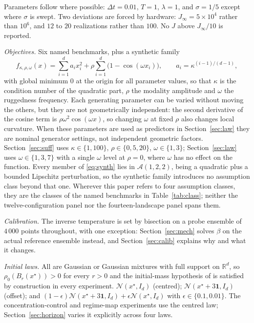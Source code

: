 \documentclass[pdflatex,sn-mathphys-num]{sn-jnl}
\theoremstyle{thmstyleone}
\theoremstyle{thmstyletwo}
\theoremstyle{thmstylethree}
\begin{document}
Parameters follow \cite[Table 1]{ghv2025} where possible: $\Delta t=0.01$, $T=1$, $\lambda=1$, and $\sigma=1/5$ except where $\sigma$ is swept. Two deviations are forced by hardware: $J_\infty=5\times10^4$ rather than $10^6$, and $12$ to $20$ realizations rather than $100$. No $J$ above $J_\infty/10$ is reported.

\emph{Objectives.} Six named benchmarks, plus a synthetic family
\begin{equation}\label{eq:synth}
f_{\kappa,\rho,\omega}(x)=\sum_{i=1}^d a_i x_i^2+\rho\sum_{i=1}^d\bigl(1-\cos(\omega x_i)\bigr),
\qquad a_i=\kappa^{(i-1)/(d-1)},
\end{equation}
with global minimum $0$ at the origin for all parameter values, so that $\kappa$ is the condition number of the quadratic part, $\rho$ the modality amplitude and $\omega$ the ruggedness frequency. Each generating parameter can be varied without moving the others, but they are not geometrically independent: the second derivative of the cosine term is $\rho\omega^2\cos(\omega x)$, so changing $\omega$ at fixed $\rho$ also changes local curvature. When these parameters are used as predictors in Section~\ref{sec:law} they are nominal generator settings, not independent geometric factors. Section~\ref{sec:suff} uses $\kappa\in\{1,100\}$, $\rho\in\{0,5,20\}$, $\omega\in\{1,3\}$; Section~\ref{sec:law} uses $\omega\in\{1,3,7\}$ with a single $\omega$ level at $\rho=0$, where $\omega$ has no effect on the function. Every member of \eqref{eq:synth} lies in $\mathcal A(1,2,2)$, being a quadratic plus a bounded Lipschitz perturbation, so the synthetic family introduces no assumption class beyond that one. Wherever this paper refers to four assumption classes, they are the classes of the named benchmarks in Table~\ref{tab:class}; neither the twelve-configuration panel nor the fourteen-landscape panel spans them.

\emph{Calibration.} The inverse temperature is set by bisection on a probe ensemble of $4\,000$ points throughout, with one exception: Section~\ref{sec:mech} solves $\beta$ on the actual reference ensemble instead, and Section~\ref{sec:calib} explains why and what it changes.

\emph{Initial laws.} All are Gaussian or Gaussian mixtures with full support on $\mathbb R^d$, so $\rho_0(B_r(x^\star))>0$ for every $r>0$ and the initial-mass hypothesis of \cite[Theorem 3.7]{fkr2024} is satisfied by construction in every experiment. $\mathcal N(x^\star,I_d)$ (centred); $\mathcal N(x^\star+3\mathbf 1,I_d)$ (offset); and $(1-\epsilon)\mathcal N(x^\star+3\mathbf 1,I_d)+\epsilon\mathcal N(x^\star,I_d)$ with $\epsilon\in\{0.1,0.01\}$. The concentration-control and regime-map experiments use the centred law; Section~\ref{sec:horizon} varies it explicitly across four laws.
\end{document}
